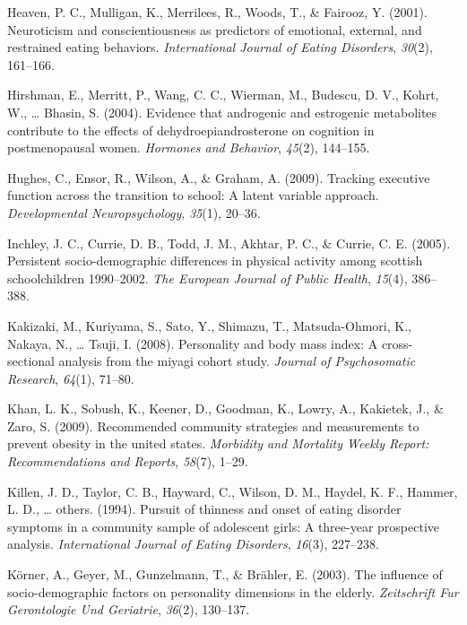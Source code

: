 \documentclass[man]{apa6}
\begin{document}
\leavevmode\hypertarget{ref-heaven2001neuroticism}{}%
Heaven, P. C., Mulligan, K., Merrilees, R., Woods, T., \& Fairooz, Y. (2001). Neuroticism and conscientiousness as predictors of emotional, external, and restrained eating behaviors. \emph{International Journal of Eating Disorders}, \emph{30}(2), 161--166.

\leavevmode\hypertarget{ref-hirshman2004evidence}{}%
Hirshman, E., Merritt, P., Wang, C. C., Wierman, M., Budescu, D. V., Kohrt, W., \ldots{} Bhasin, S. (2004). Evidence that androgenic and estrogenic metabolites contribute to the effects of dehydroepiandrosterone on cognition in postmenopausal women. \emph{Hormones and Behavior}, \emph{45}(2), 144--155.

\leavevmode\hypertarget{ref-hughes2009tracking}{}%
Hughes, C., Ensor, R., Wilson, A., \& Graham, A. (2009). Tracking executive function across the transition to school: A latent variable approach. \emph{Developmental Neuropsychology}, \emph{35}(1), 20--36.

\leavevmode\hypertarget{ref-inchley2005persistent}{}%
Inchley, J. C., Currie, D. B., Todd, J. M., Akhtar, P. C., \& Currie, C. E. (2005). Persistent socio-demographic differences in physical activity among scottish schoolchildren 1990--2002. \emph{The European Journal of Public Health}, \emph{15}(4), 386--388.

\leavevmode\hypertarget{ref-kakizaki2008personality}{}%
Kakizaki, M., Kuriyama, S., Sato, Y., Shimazu, T., Matsuda-Ohmori, K., Nakaya, N., \ldots{} Tsuji, I. (2008). Personality and body mass index: A cross-sectional analysis from the miyagi cohort study. \emph{Journal of Psychosomatic Research}, \emph{64}(1), 71--80.

\leavevmode\hypertarget{ref-khan2009recommended}{}%
Khan, L. K., Sobush, K., Keener, D., Goodman, K., Lowry, A., Kakietek, J., \& Zaro, S. (2009). Recommended community strategies and measurements to prevent obesity in the united states. \emph{Morbidity and Mortality Weekly Report: Recommendations and Reports}, \emph{58}(7), 1--29.

\leavevmode\hypertarget{ref-killen1994pursuit}{}%
Killen, J. D., Taylor, C. B., Hayward, C., Wilson, D. M., Haydel, K. F., Hammer, L. D., \ldots{} others. (1994). Pursuit of thinness and onset of eating disorder symptoms in a community sample of adolescent girls: A three-year prospective analysis. \emph{International Journal of Eating Disorders}, \emph{16}(3), 227--238.

\leavevmode\hypertarget{ref-korner2003influence}{}%
Körner, A., Geyer, M., Gunzelmann, T., \& Brähler, E. (2003). The influence of socio-demographic factors on personality dimensions in the elderly. \emph{Zeitschrift Fur Gerontologie Und Geriatrie}, \emph{36}(2), 130--137.
\end{document}

